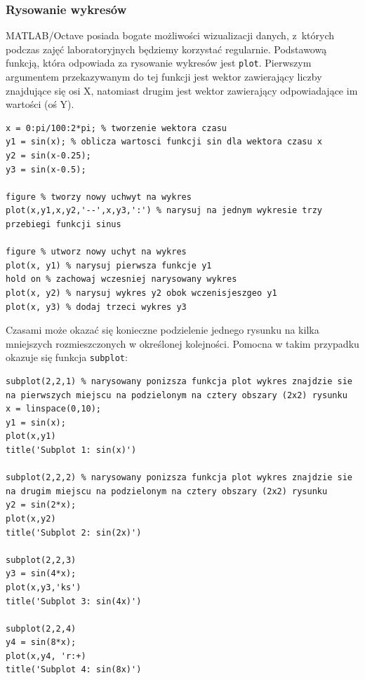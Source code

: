 \subsubsection{Rysowanie wykresów}
MATLAB/Octave posiada bogate możliwości wizualizacji danych, z~których podczas zajęć laboratoryjnych będziemy korzystać regularnie. Podstawową funkcją, która odpowiada za rysowanie wykresów jest \texttt{plot}. Pierwszym argumentem przekazywanym do tej funkcji jest wektor zawierający liczby znajdujące się osi X, natomiast drugim jest wektor zawierający odpowiadające im wartości (oś Y).
\begin{lstlisting}[caption=Rysowanie funkcji $sin$ na jednym wykresie, label=lab1/lst/plotSin]
x = 0:pi/100:2*pi; % tworzenie wektora czasu
y1 = sin(x); % oblicza wartosci funkcji sin dla wektora czasu x
y2 = sin(x-0.25);
y3 = sin(x-0.5);

figure % tworzy nowy uchwyt na wykres
plot(x,y1,x,y2,'--',x,y3,':') % narysuj na jednym wykresie trzy przebiegi funkcji sinus

figure % utworz nowy uchyt na wykres
plot(x, y1) % narysuj pierwsza funkcje y1
hold on % zachowaj wczesniej narysowany wykres
plot(x, y2) % narysuj wykres y2 obok wczenisjeszgeo y1
plot(x, y3) % dodaj trzeci wykres y3
\end{lstlisting}

Czasami może okazać się konieczne podzielenie jednego rysunku na kilka mniejszych rozmieszczonych w określonej kolejności. Pomocna w takim przypadku okazuje się funkcja \texttt{subplot}:
\begin{lstlisting}[caption=Rysowanie funkcji $sin$ na współdzielonym wykresie , label=lab1/lst/subplotSin]
subplot(2,2,1) % narysowany ponizsza funkcja plot wykres znajdzie sie na pierwszych miejscu na podzielonym na cztery obszary (2x2) rysunku 
x = linspace(0,10);
y1 = sin(x);
plot(x,y1)
title('Subplot 1: sin(x)')

subplot(2,2,2) % narysowany ponizsza funkcja plot wykres znajdzie sie na drugim miejscu na podzielonym na cztery obszary (2x2) rysunku 
y2 = sin(2*x);
plot(x,y2)
title('Subplot 2: sin(2x)')

subplot(2,2,3)
y3 = sin(4*x);
plot(x,y3,'ks')
title('Subplot 3: sin(4x)')

subplot(2,2,4)
y4 = sin(8*x);
plot(x,y4, 'r:+)
title('Subplot 4: sin(8x)')
\end{lstlisting}

